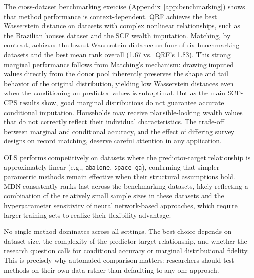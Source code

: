 The cross-dataset benchmarking exercise (Appendix~\ref{app:benchmarking}) shows that method performance is context-dependent. QRF achieves the best Wasserstein distance on datasets with complex nonlinear relationships, such as the Brazilian houses dataset and the SCF wealth imputation. Matching, by contrast, achieves the lowest Wasserstein distance on four of six benchmarking datasets and the best mean rank overall (1.67 vs.\ QRF's 1.83). This strong marginal performance follows from Matching's mechanism: drawing imputed values directly from the donor pool inherently preserves the shape and tail behavior of the original distribution, yielding low Wasserstein distances even when the conditioning on predictor values is suboptimal. But as the main SCF-CPS results show, good marginal distributions do not guarantee accurate conditional imputation. Households may receive plausible-looking wealth values that do not correctly reflect their individual characteristics. The trade-off between marginal and conditional accuracy, and the effect of differing survey designs on record matching, deserve careful attention in any application.

OLS performs competitively on datasets where the predictor-target relationship is approximately linear (e.g., \texttt{abalone}, \texttt{space\_ga}), confirming that simpler parametric methods remain effective when their structural assumptions hold. MDN consistently ranks last across the benchmarking datasets, likely reflecting a combination of the relatively small sample sizes in these datasets and the hyperparameter sensitivity of neural network-based approaches, which require larger training sets to realize their flexibility advantage.

No single method dominates across all settings. The best choice depends on dataset size, the complexity of the predictor-target relationship, and whether the research question calls for conditional accuracy or marginal distributional fidelity. This is precisely why automated comparison matters: researchers should test methods on their own data rather than defaulting to any one approach.

